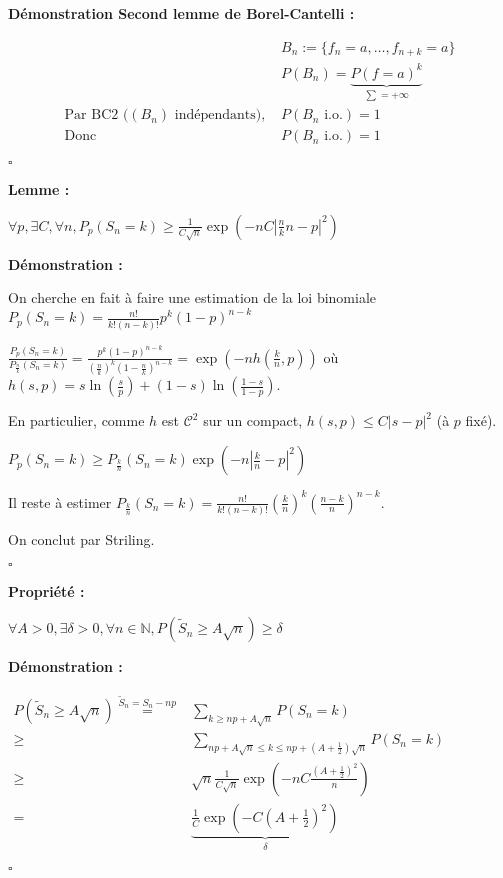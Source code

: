 \documentclass[10pt,a4paper,notitlepage ]{report}
\newcommand{\N}{\mathbb N}
\newcommand{\1}{\mathds 1}
\newcounter{th}
\newenvironment{propriete}[1][]{
	\begin{tcolorbox}
		\textbf{Propriété #1 : }
}
{\end{tcolorbox}}
\newenvironment{demo}[1][]{

	\textbf{Démonstration #1 :}
}{\begin{flushright}
	$\square$
\end{flushright}
}
\newenvironment{lemme}[1][]{
	\begin{tcolorbox}
		\textbf{Lemme #1 : }
	}
	{\end{tcolorbox}}
\begin{document}
\begin{demo}[Second lemme de Borel-Cantelli]
	\begin{align*}
		&B_n := \{f_n=a, \dots, f_{n+k}=a\} \\
		&P(B_n) =\underset {\sum = +\infty} {\underbrace{P(f=a)^k}} \\
		\text{Par BC2 ($(B_n)$ indépendants), } &P(B_n \text{ i.o.}) = 1 \\
		\text{Donc } &P(B_n \text{ i.o.}) = 1
	\end{align*}
\end{demo}

\begin{lemme}
	$\forall p, \exists C, \forall n, P_p(S_n=k)\ge \frac 1 {C\sqrt n} \exp{\left( -nC\left| \frac nk n -p\right|^2 \right)}$
\end{lemme}

\begin{demo}
	On cherche en fait à faire une estimation de la loi binomiale $P_p(S_n=k) = \frac{n!}{k!(n-k)!} p^k (1-p)^{n-k}$
	
	$\frac{P_p(S_n=k)}{P_{\frac n k}(S_n=k)} = \frac{p^k(1-p)^{n-k}}{\left(\frac n k\right)^k \left(1- \frac n k\right)^{n-k}} = \exp{\left( -nh\left(\frac k n, p\right)\right)}$ où $h(s,p) = s\ln\left(\frac s p \right) +(1-s)\ln\left(\frac{1-s}{1-p}\right)$.
	
	En particulier, comme $h$ est $\mathcal C^2$ sur un compact, $h(s,p) \le C|s-p|^2$ (à $p$ fixé).
	
	$P_p(S_n=k) \ge P_{\frac k n}(S_n=k)\exp\left( -n \left| \frac k n -p\right|^2\right)$
	
	Il reste à estimer $P_{\frac k n}(S_n=k) = \frac{n!}{k!(n-k)!}\left(\frac k n\right)^k \left( \frac {n-k} n \right)^{n-k}$.
	
	On conclut par Striling.
\end{demo}

\begin{propriete}
	$\forall A > 0, \exists \delta > 0, \forall n\in\N, P(\tilde S_n \ge A\sqrt n) \ge \delta$
\end{propriete}

\begin{demo}
	
	$\begin{aligned}
	P(\tilde S_n \ge A\sqrt n) \overset {\tilde S_n = S_n - np} =& \underset{k\ge np + A\sqrt n} \sum P(S_n=k) \\
	\ge & \underset{np + A\sqrt n \le k \le np +(A+\frac 1 2) \sqrt n} \sum P(S_n=k) \\
	\ge & \sqrt n \frac 1 {C\sqrt n} \exp \left(-nC \frac {(A+\frac 1 2)^2} n \right) \\
	=& \underset{\delta} {\underbrace{\frac 1 C \exp\left( -C(A + \frac 1 2)^2 \right)}}
	\end{aligned}$
\end{demo}
\end{document}
